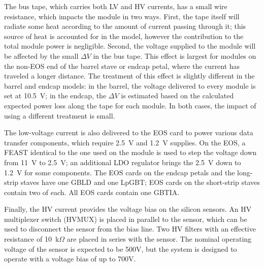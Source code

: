 The bus tape, which carries both LV and HV currents, has a small wire resistance, which impacts the
module in two ways. First,
the tape itself will radiate some heat according to the amount of current passing through it; this
source of heat is accounted for in the model, however the contribution to the total module power
is negligible.
Second,
the voltage supplied to the module will be affected by the small $\Delta V$ in the bus tape. This
effect is largest for modules on the non-EOS end of the barrel stave or endcap petal, where the current
has traveled a longer distance. The treatment of this effect is slightly different in the barrel and
endcap models: in the barrel, the voltage delivered to every module is set at 10.5~V; in the endcap,
the $\Delta V$ is estimated based on the calculated expected power loss along the tape for each module.
In both cases, the impact of using a different treatment is small.

The low-voltage current is also delivered to the EOS card to power various data transfer components,
which require 2.5~V and 1.2~V supplies.
On the EOS, a FEAST identical to the one used on the module is used to step the voltage down from 11~V
to 2.5~V; an additional LDO regulator brings the 2.5~V down to 1.2~V for some components.
The EOS cards on the endcap petals and the long-strip staves have one GBLD and one LpGBT;
EOS cards on the short-strip staves contain two of each. All EOS cards contain one GBTIA.

Finally, the HV current provides the voltage bias on the silicon sensors. An HV multiplexer
switch (HVMUX) is placed in parallel to the sensor, which can be used to disconnect the sensor from the
bias line. Two HV filters with an effective resistance of 10~k$\Omega$ are placed in series with the
sensor. The nominal operating voltage of the sensor is expected to be 500V, but the system is designed
to operate with a voltage bias of up to 700V.
